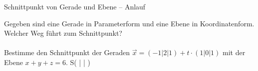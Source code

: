 \setcounter{aufgabe}{56}

\begin{aufgabe}{Schnittpunkt von Gerade und Ebene – Anlauf}
\begin{teile}
\teil Gegeben sind eine Gerade in Parameterform und eine Ebene in Koordinatenform. Welcher Weg führt zum Schnittpunkt? \\  \\ 
\teil Bestimme den Schnittpunkt der Geraden $\vec{x} = (-1|2|1) + t \cdot (1|0|1)$ mit der Ebene $x + y + z = 6$. S( \leerfeld | \leerfeld | \leerfeld )
\end{teile}
\end{aufgabe}

